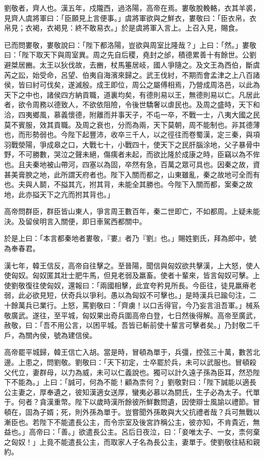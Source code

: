 
\begin{pinyinscope}
劉敬者，齊人也。漢五年，戍隴西，過洛陽，高帝在焉。婁敬脫輓輅，衣其羊裘，見齊人虞將軍曰：「臣願見上言便事。」虞將軍欲與之鮮衣，婁敬曰：「臣衣帛，衣帛見；衣褐，衣褐見：終不敢易衣。」於是虞將軍入言上。上召入見，賜食。

已而問婁敬，婁敬說曰：「陛下都洛陽，豈欲與周室比隆哉？」上曰：「然。」婁敬曰：「陛下取天下與周室異。周之先自后稷，堯封之邰，積德累善十有餘世。公劉避桀居豳。太王以狄伐故，去豳，杖馬箠居岐，國人爭隨之。及文王為西伯，斷虞芮之訟，始受命，呂望、伯夷自海濱來歸之。武王伐紂，不期而會孟津之上八百諸侯，皆曰紂可伐矣，遂滅殷。成王即位，周公之屬傅相焉，乃營成周洛邑，以此為天下之中也，諸侯四方納貢職，道裏均矣，有德則易以王，無德則易以亡。凡居此者，欲令周務以德致人，不欲依阻險，令後世驕奢以虐民也。及周之盛時，天下和洽，四夷鄉風，慕義懷德，附離而并事天子，不屯一卒，不戰一士，八夷大國之民莫不賓服，效其貢職。及周之衰也，分而為兩，天下莫朝，周不能制也。非其德薄也，而形勢弱也。今陛下起豐沛，收卒三千人，以之徑往而卷蜀漢，定三秦，與項羽戰滎陽，爭成皋之口，大戰七十，小戰四十，使天下之民肝腦涂地，父子暴骨中野，不可勝數，哭泣之聲未絕，傷痍者未起，而欲比隆於成康之時，臣竊以為不侔也。且夫秦地被山帶河，四塞以為固，卒然有急，百萬之眾可具也。因秦之故，資甚美膏腴之地，此所謂天府者也。陛下入關而都之，山東雖亂，秦之故地可全而有也。夫與人鬬，不搤其亢，拊其背，未能全其勝也。今陛下入關而都，案秦之故地，此亦搤天下之亢而拊其背也。」

高帝問群臣，群臣皆山東人，爭言周王數百年，秦二世即亡，不如都周。上疑未能決。及留侯明言入關便，即日車駕西都關中。

於是上曰：「本言都秦地者婁敬，『婁』者乃『劉』也。」賜姓劉氏，拜為郎中，號為奉春君。

漢七年，韓王信反，高帝自往擊之。至晉陽，聞信與匈奴欲共擊漢，上大怒，使人使匈奴。匈奴匿其壯士肥牛馬，但見老弱及羸畜。使者十輩來，皆言匈奴可擊。上使劉敬復往使匈奴，還報曰：「兩國相擊，此宜夸矜見所長。今臣往，徒見羸瘠老弱，此必欲見短，伏奇兵以爭利。愚以為匈奴不可擊也。」是時漢兵已踰句注，二十餘萬兵已業行。上怒，罵劉敬曰：「齊虜！以口舌得官，今乃妄言沮吾軍。」械系敬廣武。遂往，至平城，匈奴果出奇兵圍高帝白登，七日然後得解。高帝至廣武，赦敬，曰：「吾不用公言，以困平城。吾皆已斬前使十輩言可擊者矣。」乃封敬二千戶，為關內侯，號為建信侯。

高帝罷平城歸，韓王信亡入胡。當是時，冒頓為單于，兵彊，控弦三十萬，數苦北邊。上患之，問劉敬。劉敬曰：「天下初定，士卒罷於兵，未可以武服也。冒頓殺父代立，妻群母，以力為威，未可以仁義說也。獨可以計久遠子孫為臣耳，然恐陛下不能為。」上曰：「誠可，何為不能！顧為柰何？」劉敬對曰：「陛下誠能以適長公主妻之，厚奉遺之，彼知漢適女送厚，蠻夷必慕以為閼氏，生子必為太子。代單于。何者？貪漢重幣。陛下以歲時漢所餘彼所鮮數問遺，因使辯士風諭以禮節。冒頓在，固為子婿；死，則外孫為單于。豈嘗聞外孫敢與大父抗禮者哉？兵可無戰以漸臣也。若陛下不能遣長公主，而令宗室及後宮詐稱公主，彼亦知，不肯貴近，無益也。」高帝曰：「善。」欲遣長公主。呂后日夜泣，曰：「妾唯太子、一女，柰何棄之匈奴！」上竟不能遣長公主，而取家人子名為長公主，妻單于。使劉敬往結和親約。


\end{pinyinscope}
